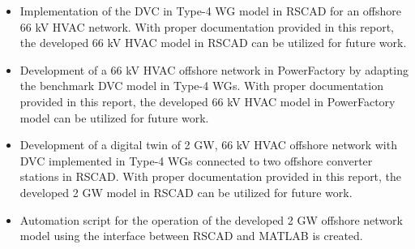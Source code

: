 \begin{itemize}
    \item Implementation of the \gls{DVC} in Type-4 \gls{WG} model in RSCAD for an offshore 66 kV \gls{HVAC} network. With proper documentation provided in this report, the developed 66 kV \gls{HVAC} model in RSCAD can be utilized for future work.
    
    \item Development of a 66 kV \gls{HVAC} offshore network in PowerFactory by adapting the benchmark \gls{DVC} model in Type-4 \gls{WG}s. With proper documentation provided in this report, the developed 66 kV \gls{HVAC} model in PowerFactory model can be utilized for future work.
    
    \item Development of a digital twin of 2 GW, 66 kV \gls{HVAC} offshore network with \gls{DVC} implemented in Type-4 \gls{WG}s connected to two offshore converter stations in RSCAD. With proper documentation provided in this report, the developed 2 GW model in RSCAD can be utilized for future work.
    
    \item Automation script for the operation of the developed 2 GW offshore network model using the interface between RSCAD and MATLAB is created. %
\end{itemize}

